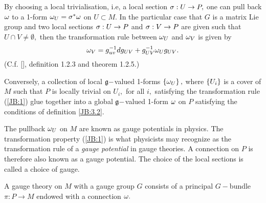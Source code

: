 \begin{rem}
 By choosing a local trivialisation, i.e, a local section $\sigma : U \to P,$ one can pull back $\omega$ to a 1-form
$\omega_{U}= \sigma^{*}\omega$ on $U \subset M.$ In the particular case that $G$ is a matrix Lie group and two local sections
$\sigma:U \to P$ and $\sigma: V \to P$ are given such that $U \cap V \neq \emptyset,$ then the transformation rule
between $\omega_{U}$ and $\omega_{V}$ is given by
\begin{equation}
 \label{JB:1}
\omega_{V}=g_{uv}^{-1} d g_{UV} + g^{-1}_{UV} \omega_{U} g_{UV}.
\end{equation}
(C.f. [\cite{DB}], definition 1.2.3 and theorem 1.2.5.)

Conversely, a collection of local $\mathfrak{g}-$valued 1-forms $\left\{ \omega_{U} \right\},$ where $\left\{ U_{i} \right\}$ is a cover of $M$ such
that $P$ is locally trivial on $U_{i},$ for all $i,$ satisfying the transformation rule (\ref{JB:1}) glue together into
a global $\mathfrak{g}-$valued 1-form $\omega$ on $P$ satisfying the conditions of definition \ref{JB:3.2}.

The pullback $\omega_{U}$ on $M$ are known as gauge potentials in physics. The transformation property (\ref{JB:1}) is
what physicists may recognize as the transformation rule of a \emph{gauge potential} in gauge theories. A connection on
$P$ is therefore also known as a gauge potential. The choice of the local sections is called a choice of gauge.
\end{rem}

 \begin{defn}
  \label{JB:3.7}
A gauge theory on $M$ with a gauge group $G$ consists of a principal $G-$bundle $\pi:P \to M$ endowed with a connection
$\omega.$
 \end{defn}




